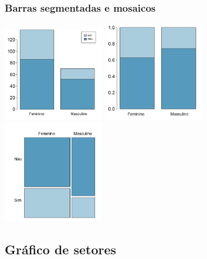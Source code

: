 \begin{frame}
\frametitle{Barras segmentadas e mosaicos}
\justifying
{}

\begin{center}
\includegraphics[width=0.33\textwidth]{1-7_categorical_data/gender_seg_bar.png}
\includegraphics[width=0.33\textwidth]{1-7_categorical_data/gender_rel_seg_bar.png}
\includegraphics[width=0.33\textwidth]{1-7_categorical_data/gender_mosaic.png}
\end{center}

\end{frame}


\subsection{Gráfico de setores}


